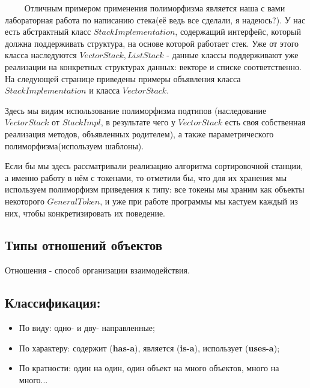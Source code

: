 $\qquad$ Отличным примером применения полиморфизма является наша с вами лабораторная работа по написанию стека(её ведь все сделали, я надеюсь?). У нас есть абстрактный класс $StackImplementation$, содержащий интерфейс, который должна поддерживать структура, на основе которой работает стек. Уже от этого класса наследуются $VectorStack, ListStack$ - данные классы поддерживают уже реализации на конкретных структурах данных: векторе и списке соответственно. На следующей странице приведены примеры объявления класса $StackImplementation$ и класса $VectorStack$.

Здесь мы видим использование полиморфизма подтипов (наследование $VectorStack$ от $StackImpl$, в результате чего у $VectorStack$ есть своя собственная реализация методов, объявленных родителем), а также параметрического полиморфизма(используем шаблоны).
\begin{notice}
Если бы мы здесь рассматривали реализацию алгоритма сортировочной станции, а именно работу в нём с токенами, то отметили бы, что для их хранения мы используем полиморфизм приведения к типу: все токены мы храним как объекты некоторого $GeneralToken$, и уже при работе программы мы кастуем каждый из них, чтобы конкретизировать их поведение.
\end{notice}

\lstset{language=C++, keepspaces = true, extendedchars=\false}

\lstset{language=C++, keepspaces = true, extendedchars=\false}


\newpage

\subsection{Типы отношений объектов}
\begin{definition}
    Отношения - способ организации взаимодействия.
\end{definition}

\subsection{Классификация:}
\begin{itemize}
    \item По виду: одно- и дву- направленные;
    \item По характеру: содержит (\textbf{has-a}), является (\textbf{is-a}), использует (\textbf{uses-a});
    \item По кратности: один на один, один объект на много объектов, много на много...
\end{itemize}

